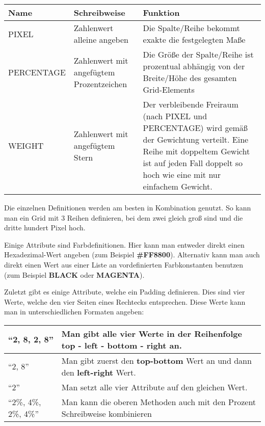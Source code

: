 \begin{center}
\begin{tabularx}{\textwidth}{|l|l|X|} 
\hline
Name & Schreibweise & Funktion \\
\hline\hline
PIXEL & Zahlenwert alleine angeben & Die Spalte/Reihe bekommt exakte die festgelegten Maße \\
\hline
PERCENTAGE &  Zahlenwert mit angefügtem Prozentzeichen & Die Größe der Spalte/Reihe ist prozentual abhängig von der Breite/Höhe des gesamten Grid-Elements\\
\hline
WEIGHT & Zahlenwert mit angefügtem Stern & Der verbleibende Freiraum (nach PIXEL und PERCENTAGE) wird gemäß der Gewichtung verteilt. Eine Reihe mit doppeltem Gewicht ist auf jeden Fall doppelt so hoch wie eine mit nur einfachem Gewicht.\\
\hline
\end{tabularx}
\end{center}

Die einzelnen Definitionen werden am besten in Kombination genutzt. So kann man ein Grid mit 3 Reihen definieren, bei dem zwei gleich groß sind und die dritte hundert Pixel hoch.

Einige Attribute sind Farbdefinitionen. Hier kann man entweder direkt einen Hexadezimal-Wert angeben (zum Beispiel \textbf{\#FF8800}). Alternativ kann man auch direkt einen Wert aus einer Liste an vordefinierten Farbkonstanten benutzen (zum Beispiel \textbf{BLACK} oder \textbf{MAGENTA}).

Zuletzt gibt es einige Attribute, welche ein Padding definieren. Dies sind vier Werte, welche den vier Seiten eines Rechtecks entsprechen. Diese Werte kann man in unterschiedlichen Formaten angeben:

\begin{center}
\begin{tabularx}{\textwidth}{|l|l|} 
\hline
``2, 8, 2, 8'' &  Man gibt alle vier Werte in der Reihenfolge \textbf{top} - \textbf{left} - \textbf{bottom} - \textbf{right} an. \\
\hline
``2, 8'' &  Man gibt zuerst den \textbf{top-bottom} Wert an und dann den \textbf{left-right} Wert.\\
\hline
``2'' &  Man setzt alle vier Attribute auf den gleichen Wert.\\
\hline
``2\%, 4\%, 2\%, 4\%'' &  Man kann die oberen Methoden auch mit den Prozent Schreibweise kombinieren\\
\hline
\end{tabularx}
\end{center}

